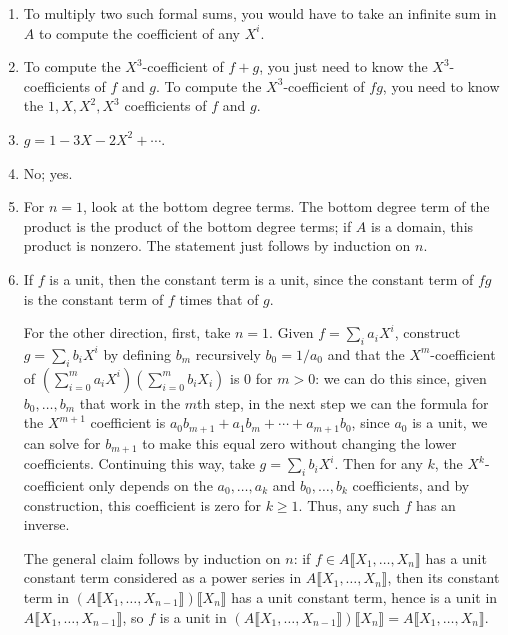\documentclass[12pt]{amsart}
\newcommand{\Bold}[1]{\contour{black}{#1}}
\newcommand{\solution}[1]{\ifthenelse {\equal{\displaysol}{1}} {\begin{framed}{\color{meretale}\noindent #1}\end{framed}} { \ }}
\newcommand\itema{\stepcounter{enumii}\item[{\Bold{(\theenumii)}}]}
\begin{document}
\begin{enumerate}
\begin{samepage}
\begin{enumerate}
\end{enumerate}
\end{samepage}

\solution{
\begin{enumerate}
\itema To multiply two such formal sums, you would have to take an infinite sum in $A$ to compute the coefficient of any $X^i$.
\itema To compute the $X^3$-coefficient of $f+g$, you just need to know the $X^3$-coefficients of $f$ and $g$. To compute the $X^3$-coefficient of $fg$, you need to know the $1, X, X^2, X^3$ coefficients of $f$ and $g$.
\itema $g= 1 - 3X - 2X^2 + \cdots$.
\itema No; yes.
\itema For $n=1$, look at the bottom degree terms. The bottom degree term of the product is the product of the bottom degree terms; if $A$ is a domain, this product is nonzero. The statement just follows by induction on $n$.
\itema If $f$ is a unit, then the constant term is a unit, since the constant term of $fg$ is the constant term of $f$ times that of $g$. 

For the other direction, first, take $n=1$.  Given $f=\sum_i a_i X^i$, construct $g=\sum_i b_i X^i$ by defining $b_m$ recursively $b_0=1/a_0$ and that the $X^m$-coefficient of $(\sum_{i=0}^m a_i X^i)(\sum_{i=0}^m b_i X_i)$ is $0$ for $m>0$: we can do this since, given $b_0,\dots,b_m$ that work in the $m$th step, in the next step we can the formula for the $X^{m+1}$ coefficient is $a_0 b_{m+1} + a_1 b_m + \cdots + a_{m+1} b_0$, since $a_0$ is a unit, we can solve for $b_{m+1}$ to make this equal zero without changing the lower coefficients. Continuing this way, take $g= \sum_i b_i X^i$. Then  for any $k$, the $X^k$-coefficient only depends on the $a_0,\dots,a_k$ and $b_0,\dots,b_k$ coefficients, and by construction, this coefficient is zero for $k\geq 1$. Thus, any such $f$ has an inverse.

The general claim follows by induction on $n$: if $f\in A\llbracket X_1,\dots,X_n \rrbracket$ has a unit constant term considered as a power series in $A\llbracket X_1,\dots,X_n \rrbracket$, then its constant term in  $(A\llbracket X_1,\dots,X_{n-1} \rrbracket) \llbracket X_n \rrbracket$ has a unit constant term, hence is a unit in $A\llbracket X_1,\dots,X_{n-1} \rrbracket$, so $f$ is a unit in $(A\llbracket X_1,\dots,X_{n-1} \rrbracket) \llbracket X_n \rrbracket = A\llbracket X_1,\dots,X_n \rrbracket$.
\end{enumerate}
}





\end{enumerate}
\end{document}
